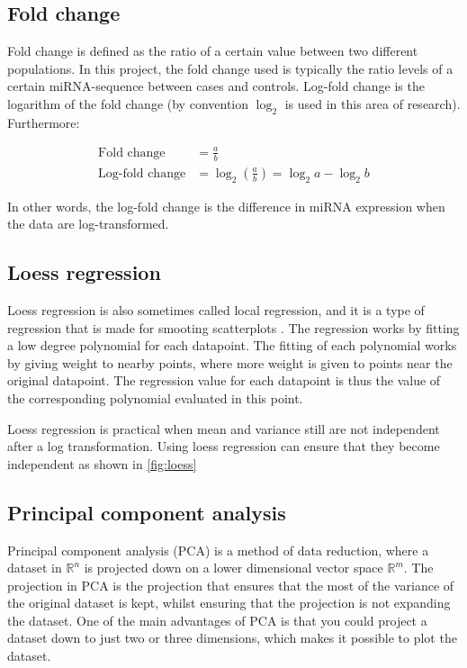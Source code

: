\subsection{Fold change}
Fold change is defined as the ratio of a certain value between two different populations. In this project, the fold change used is typically the ratio levels of a certain miRNA-sequence between cases and controls. Log-fold change is the logarithm of the fold change (by convention $\log_2$ is used in this area of research). Furthermore: 

\begin{align*}
    \text{Fold change} &= \frac{a}{b} \\
    \text{Log-fold change} &= \log_2 \left(\frac{a}{b}\right) = \log_2 a - \log_2 b
\end{align*}

In other words, the log-fold change is the difference in miRNA expression when the data are log-transformed.

\subsection{Loess regression}
\label{subsec:loess_regression}

Loess regression is also sometimes called local regression, and it is a type of regression that is made for smooting scatterplots \citep{loess}. The regression works by fitting a low degree polynomial for each datapoint. The fitting of each polynomial works by giving weight to nearby points, where more weight is given to points near the original datapoint. The regression value for each datapoint is thus the value of the corresponding polynomial evaluated in this point.

Loess regression is practical when mean and variance still are not independent after a log transformation. Using loess regression can ensure that they become independent as shown in \autoref{fig:loess}


\subsection{Principal component analysis}

Principal component analysis (PCA) is a method of data reduction, where a dataset in $\mathbb{R}^n$ is projected down on a lower dimensional vector space $\mathbb{R}^m$. The projection in PCA is the projection that ensures that the most of the variance of the original dataset is kept, whilst ensuring that the projection is not expanding the dataset. One of the main advantages of PCA is that you could project a dataset down to just two or three dimensions, which makes it possible to plot the dataset.

